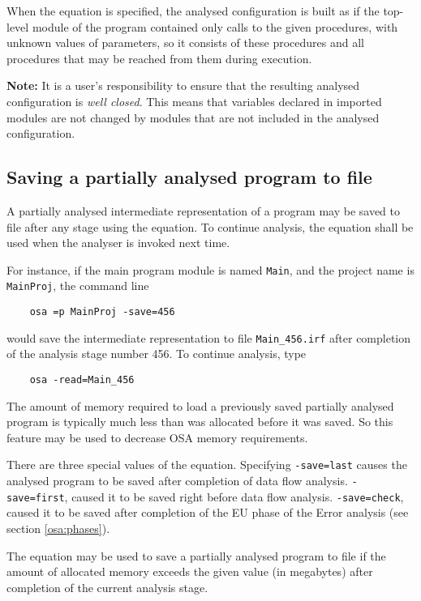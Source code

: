 When the equation  is specified, the analysed configuration
is built as if the top-level module of the program contained only calls
to the given procedures, with unknown values of parameters, so
it consists of these procedures and all procedures that may be 
reached from them during execution.

{\bf Note:} It is a user's responsibility to ensure that the
resulting analysed configuration is {\em well closed}.
This means that variables declared in imported modules are 
not changed by modules that are not included in the analysed configuration. 


\subsection{Saving a partially analysed program to file}
\label{osa:speedup:save}

A partially analysed intermediate representation of a program may be
saved to file after any stage using the  equation.
To continue analysis, the  equation shall be used when
the analyser is invoked next time.

For instance, if the main program module is named \verb'Main', and 
the project name is \verb'MainProj', the command line

\verb'    osa =p MainProj -save=456 '

would save the intermediate representation to file \verb'Main_456.irf'
after completion of the analysis stage number 456. To continue analysis, 
type 

\verb'    osa -read=Main_456'

The amount of memory required to load a previously saved partially 
analysed program is typically much less than was allocated before 
it was saved. So this feature may be used to decrease OSA memory 
requirements.

There are three special values of the  equation.
Specifying \verb'-save=last' causes the analysed program to be saved after
completion of data flow analysis. \verb'-save=first', caused it to be saved
right before data flow analysis. \verb'-save=check', caused it to be saved
after completion of the EU phase of the Error analysis 
(see section \ref{osa:phases}). 

The equation  may be used to save a partially analysed 
program to file if the amount of allocated memory exceeds the given
value (in megabytes) after completion of the current analysis stage.


